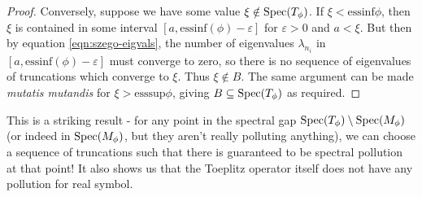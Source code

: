 \documentclass[../main.tex]{subfiles}
\begin{document}
\begin{proof}
Conversely, suppose we have some value $\xi \notin \mathrm{Spec}(T_\phi)$. If $\xi <
\mathrm{essinf}\phi$, then $\xi$ is contained in some interval $[a,
\mathrm{essinf}(\phi) - \varepsilon]$ for $\varepsilon > 0$ and $a < \xi$. But
then by equation \ref{eqn:szego-eigvals}, the number of eigenvalues
$\lambda_{n_i}$ in $[a, \mathrm{essinf}(\phi) - \varepsilon]$ must converge to
zero, so there is no sequence of eigenvalues of truncations which converge to
$\xi$. Thus $\xi \notin B$. The same argument can be made \emph{mutatis
mutandis} for $\xi > \mathrm{esssup}\phi$, giving $B \subseteq \mathrm{Spec}(T_\phi)$ as
required.
\end{proof}

This is a striking result - for any point in the spectral gap $\mathrm{Spec}(T_\phi)
\setminus \mathrm{Spec}(M_\phi)$ (or indeed in $\mathrm{Spec}(M_\phi)$, but they aren't really
polluting anything), we can choose a sequence of truncations such that there is
guaranteed to be spectral pollution at that point! It also shows us that the
Toeplitz operator itself does not have any pollution for real symbol.
\end{document}

